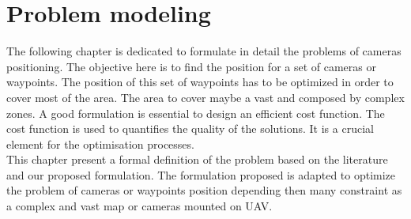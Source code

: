 \chapter{Problem modeling}\label{chap:formulation}
\minitoc

%
%	




The following chapter is dedicated to formulate in detail the problems of cameras positioning. 
The objective here is to find the position for a set of cameras or waypoints. The position of this set of waypoints has to be optimized in order to cover most of the area. The area to cover maybe a vast and composed by complex zones.
A good formulation is essential to design an efficient cost function. The cost function is used to quantifies the quality of the solutions. It is a crucial element for the optimisation processes.\\
This chapter present a formal definition of the problem based on the literature and our proposed formulation. 
The formulation proposed is adapted to optimize the problem of cameras or waypoints position depending then many constraint as  a complex and vast map or  cameras mounted on UAV.

